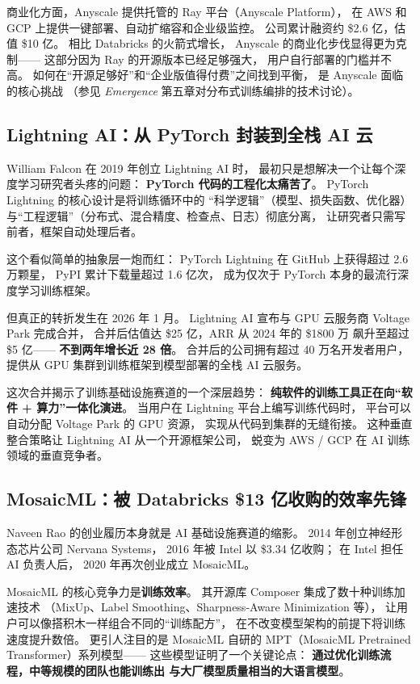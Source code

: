 商业化方面，Anyscale 提供托管的 Ray 平台（Anyscale Platform），
在 AWS 和 GCP 上提供一键部署、自动扩缩容和企业级监控。
公司累计融资约 \$2.6 亿，估值 \$10 亿。
相比 Databricks 的火箭式增长，
Anyscale 的商业化步伐显得更为克制——
这部分因为 Ray 的开源版本已经足够强大，
用户自行部署的门槛并不高。
如何在``开源足够好''和``企业版值得付费''之间找到平衡，
是 Anyscale 面临的核心挑战
（参见 \textit{Emergence} 第五章对分布式训练编排的技术讨论）。


\subsection{Lightning AI：从 PyTorch 封装到全栈 AI 云}

William Falcon 在 2019 年创立 Lightning AI 时，
最初只是想解决一个让每个深度学习研究者头疼的问题：
\textbf{PyTorch 代码的工程化太痛苦了}。
PyTorch Lightning 的核心设计是将训练循环中的
``科学逻辑''（模型、损失函数、优化器）
与``工程逻辑''（分布式、混合精度、检查点、日志）彻底分离，
让研究者只需写前者，框架自动处理后者。

这个看似简单的抽象层一炮而红：
PyTorch Lightning 在 GitHub 上获得超过 2.6 万颗星，
PyPI 累计下载量超过 1.6 亿次，
成为仅次于 PyTorch 本身的最流行深度学习训练框架。

但真正的转折发生在 2026 年 1 月。
Lightning AI 宣布与 GPU 云服务商 Voltage Park 完成合并，
合并后估值达 \$25 亿，ARR 从 2024 年的 \$1800 万
飙升至超过 \$5 亿——
\textbf{不到两年增长近 28 倍}。
合并后的公司拥有超过 40 万名开发者用户，
提供从 GPU 集群到训练框架到模型部署的全栈 AI 云服务。

这次合并揭示了训练基础设施赛道的一个深层趋势：
\textbf{纯软件的训练工具正在向``软件 + 算力''一体化演进}。
当用户在 Lightning 平台上编写训练代码时，
平台可以自动分配 Voltage Park 的 GPU 资源，
实现从代码到集群的无缝衔接。
这种垂直整合策略让 Lightning AI 从一个开源框架公司，
蜕变为 AWS / GCP 在 AI 训练领域的垂直竞争者。


\subsection{MosaicML：被 Databricks \$13 亿收购的效率先锋}

Naveen Rao 的创业履历本身就是 AI 基础设施赛道的缩影。
2014 年创立神经形态芯片公司 Nervana Systems，
2016 年被 Intel 以 \$3.34 亿收购；
在 Intel 担任 AI 负责人后，
2020 年再次创业成立 MosaicML。

MosaicML 的核心竞争力是\textbf{训练效率}。
其开源库 Composer 集成了数十种训练加速技术
（MixUp、Label Smoothing、Sharpness-Aware Minimization 等），
让用户可以像搭积木一样组合不同的``训练配方''，
在不改变模型架构的前提下将训练速度提升数倍。
更引人注目的是 MosaicML 自研的 MPT（MosaicML Pretrained Transformer）系列模型——
这些模型证明了一个关键论点：
\textbf{通过优化训练流程，中等规模的团队也能训练出
与大厂模型质量相当的大语言模型}。

